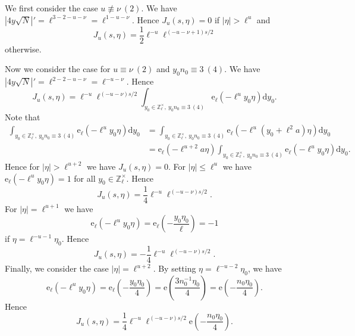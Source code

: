 \documentclass[10pt,oneside,reqno]{amsart}
\makeatletter
\newcommand\rmd{\mathrm{d}}
\newcommand\rme{\mathrm{e}}
\newcommand\ZZ{\mathbb{Z}}
\renewcommand\leq{\leqslant}
\newcommand\legendresymbol[2]{\genfrac{(}{)}{}{}{#1}{#2}}
\theoremstyle{THEOREM}
\theoremstyle{DEFINITION}
\theoremstyle{EXERCISE}
\numberwithin{equation}{section}
\renewenvironment{proof}[1][\proofname]{\par
  \vspace{-6pt}
  \pushQED{\qed}
  \normalfont \topsep6\p@\@plus6\p@\relax
  \trivlist
  \item[\hskip\labelsep\rmfamily\bfseries
    #1\@addpunct{:}]\ignorespaces
}{
  \popQED\endtrivlist\@endpefalse
  \vspace{-6pt}
}
\makeatother
\begin{document}
\begin{proof}
We first consider the case $u\not\equiv \nu\ (2)$. We have $|4y\sqrt{N}|'=\ell^{3-2-u-\nu}=\ell^{1-u-\nu}$. Hence $J_u(s,\eta)=0$ if $|\eta| > \ell^u$ and
\[
J_u(s,\eta)=\frac{1}{2}\ell^{-u}\ell^{(-u-\nu+1)s/2}
\] 
otherwise.

Now we consider the case for $u\equiv \nu\ (2)$ and $y_0n_0\equiv 3\ (4)$. We have $|4y\sqrt{N}|'=\ell^{2-2-u-\nu}=\ell^{-u-\nu}$. Hence
\[
J_u(s,\eta)=\ell^{-u}\ell^{(-u-\nu)s/2}\int_{y_0\in\ZZ_\ell^\times,\ y_0n_0\equiv 3\ (4)} \rme_\ell(-\ell^uy_0\eta)\rmd y_0.
\]
Note that
\begin{align*}
   \int_{y_0\in\ZZ_\ell^\times,\ y_0n_0\equiv 3\ (4)} \rme_\ell(-\ell^uy_0\eta)\rmd y_0 & =\int_{y_0\in\ZZ_\ell^\times,\ y_0n_0\equiv 3\ (4)} \rme_\ell(-\ell^u(y_0+\ell^2 a)\eta)\rmd y_0  \\
     & =\rme_\ell(-\ell^{u+2}a\eta)\int_{y_0\in\ZZ_\ell^\times,\ y_0n_0\equiv 3\ (4)} \rme_\ell(-\ell^uy_0\eta)\rmd y_0.
\end{align*}
Hence for $|\eta|>\ell^{u+2}$ we have $J_u(s,\eta)=0$. For $|\eta| \leq \ell^u$ we have $\rme_\ell(-\ell^uy_0\eta)=1$ for all $y_0\in \ZZ_\ell^\times$. Hence
\[
J_u(s,\eta)=\frac{1}{4}\ell^{-u}\ell^{(-u-\nu)s/2}.
\]
For $|\eta|= \ell^{u+1}$ we have 
\[
\rme_\ell(-\ell^u y_0\eta)=\rme_\ell\left(-\frac{y_0\eta_0}{\ell}\right)=-1
\]
if $\eta=\ell^{-u-1}\eta_0$. Hence 
\[
J_u(s,\eta)=-\frac{1}{4}\ell^{-u}\ell^{(-u-\nu)s/2}.
\]
Finally, we consider the case $|\eta|= \ell^{u+2}$. By setting $\eta=\ell^{-u-2}\eta_0$, we have
\[
\rme_\ell(-\ell^u y_0\eta)=\rme_\ell\left(-\frac{y_0\eta_0}{4}\right)=\rme\legendresymbol{3n_0^{-1}\eta_0}{4}= \rme\left(-\frac{n_0\eta_0}{4}\right).
\]
Hence
\[
J_u(s,\eta)=\frac14\ell^{-u}\ell^{(-u-\nu)s/2}\rme\left(-\frac{n_0\eta_0}{4}\right).
\]


\end{proof}
\end{document}
